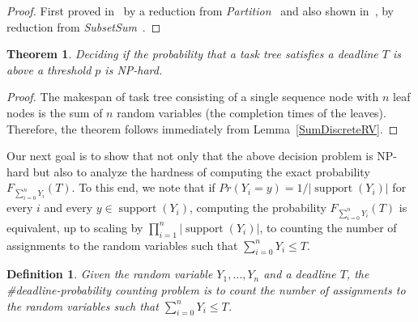 \documentclass{article}
\newtheorem{theorem}{Theorem}
\newtheorem{definition}{Definition}
\DeclareMathOperator{\support}{support}
\begin{document}
\begin{proof} 
First proved in~\cite{mohring2001scheduling} by a reduction from \textit{Partition}~\cite[problem number SP]{Garey:1990:CIG:574848} and also shown in~\cite{cohen2015estimating}, by reduction from \textit{SubsetSum}~\cite[problem number SP13]{Garey:1990:CIG:574848}.
%
\end{proof}
 
\begin{theorem}
Deciding if the probability that a task tree satisfies a deadline $T$ is above a threshold $p$ is NP-hard.
\end{theorem}

\begin{proof} The makespan of task tree consisting of a single sequence node with $n$ leaf nodes is the sum of $n$ random variables (the completion times of the leaves). Therefore, the theorem follows immediately from Lemma~\ref{SumDiscreteRV}. 
\end{proof}

Our next goal is to show that not only that the above decision problem is NP-hard but also to analyze the hardness of computing the exact probability $F_{\sum_{i=0}^{n} Y_{i}}(T)$. To this end, we note that 
if $Pr(Y_i=y)=1/|\support(Y_i)|$ for every $i$ and every $y\in\support(Y_i)$, computing the probability $F_{\sum_{i=0}^{n} Y_{i}}(T)$ is equivalent, up to scaling by $\prod_{i=1}^n |\support(Y_i)|$, to counting the number of assignments to the random variables  such that $\sum_{i=0}^{n} Y_{i} \leq T$. 

\begin{definition} 
	Given the random variable $Y_1,\dots,Y_n$ and a deadline $T$,
	the \#deadline-probability counting problem is to count the number of assignments to the random variables such that $\sum_{i=0}^{n} Y_{i} \leq T$.
\end{definition}
\end{document}
